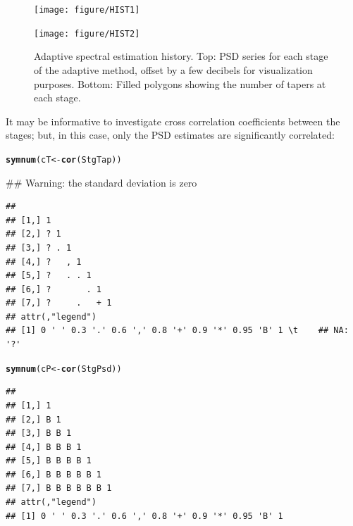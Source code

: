 \documentclass{article}\usepackage{graphicx, color}
\makeatletter
\newcommand{\hlfunctioncall}[1]{\textcolor[rgb]{0.501960784313725,0,0.329411764705882}{\textbf{#1}}}%
\newenvironment{kframe}{%
 \def\at@end@of@kframe{}%
 \ifinner\ifhmode%
  \def\at@end@of@kframe{\end{minipage}}%
  \begin{minipage}{\columnwidth}%
 \fi\fi%
 \def\FrameCommand##1{\hskip\@totalleftmargin \hskip-\fboxsep
 \colorbox{shadecolor}{##1}\hskip-\fboxsep
     \hskip-\linewidth \hskip-\@totalleftmargin \hskip\columnwidth}%
 \MakeFramed {\advance\hsize-\width
   \@totalleftmargin\z@ \linewidth\hsize
   \@setminipage}}%
 {\par\unskip\endMakeFramed%
 \at@end@of@kframe}
\newenvironment{knitrout}{}{} %
\makeatother
\begin{document}
\begin{figure}[htb!]
\begin{center}
\begin{knitrout}
\color{fgcolor}
\texttt{[image: figure/HIST1]} 

\end{knitrout}

\begin{knitrout}
\color{fgcolor}
\texttt{[image: figure/HIST2]} 

\end{knitrout}

\caption{Adaptive spectral estimation history.
Top: PSD series for each stage of the adaptive method, 
offset by a few decibels for visualization purposes.
Bottom: Filled polygons showing the number of tapers at each stage.
}
\label{fig:psdhist}
\end{center}
\end{figure}

It may be informative to investigate cross correlation
coefficients between the stages;
but, in this case, only the PSD estimates are significantly correlated:
\begin{knitrout}
\color{fgcolor}\begin{kframe}
\begin{alltt}
\hlfunctioncall{symnum}(cT <- \hlfunctioncall{cor}(StgTap))
\end{alltt}


{\ttfamily\noindent\textcolor{warningcolor}{\#\# Warning: the standard deviation is zero}}\begin{verbatim}
##                   
## [1,] 1            
## [2,] ? 1          
## [3,] ? . 1        
## [4,] ?   , 1      
## [5,] ?   . . 1    
## [6,] ?       . 1  
## [7,] ?     .   + 1
## attr(,"legend")
## [1] 0 ' ' 0.3 '.' 0.6 ',' 0.8 '+' 0.9 '*' 0.95 'B' 1 \t    ## NA: '?'
\end{verbatim}
\end{kframe}
\end{knitrout}

\begin{knitrout}
\color{fgcolor}\begin{kframe}
\begin{alltt}
\hlfunctioncall{symnum}(cP <- \hlfunctioncall{cor}(StgPsd))
\end{alltt}
\begin{verbatim}
##                   
## [1,] 1            
## [2,] B 1          
## [3,] B B 1        
## [4,] B B B 1      
## [5,] B B B B 1    
## [6,] B B B B B 1  
## [7,] B B B B B B 1
## attr(,"legend")
## [1] 0 ' ' 0.3 '.' 0.6 ',' 0.8 '+' 0.9 '*' 0.95 'B' 1
\end{verbatim}
\end{kframe}
\end{knitrout}
\end{document}
